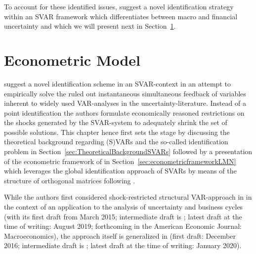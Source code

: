 \documentclass[a4paper,11pt,listof=nochaptergap,oneside,pointednumbers,bibtotoc,bigheadings,liststotoc,hidelinks]{scrbook}
\theoremstyle{mysatz}
\theoremstyle{mydefinition}
\theoremstyle{mytheorem}
\theoremstyle{mybemerkung}
\begin{document}
To account for these identified issues, \citet{ludvigsonetal:19} suggest a novel identification strategy within an SVAR framework which differentiates between macro and financial uncertainty and which we will present next in Section~\ref{EconometricModel}.




\chapter{Econometric Model}
\label{EconometricModel}
\citep{ludvigsonetal:18,ludvigsonetal:19} suggest a novel identification scheme in an SVAR-context in an attempt to empirically solve the ruled out instantaneous simultaneous feedback of variables inherent to widely used VAR-analyses in the uncertainty-literature. Instead of a point identification the authors formulate economically reasoned restrictions on the shocks generated by the SVAR-system to adequately shrink the set of possible solutions. This chapter hence first sets the stage by discussing the theoretical background regarding (S)VARs and the so-called identification problem in Section~\ref{sec:TheoreticalBackgroundSVARs} followed by a presentation of the econometric framework of \citet{ludvigsonetal:19} in Section~\ref{sec:econometricframeworkLMN} which leverages the global identification approach of SVARs by means of the structure of orthogonal matrices following \citet{rubioetal:10}.

While the authors first considered shock-restricted structural VAR-approach in \citet{ludvigsonetal:19} in the context of an application to the analysis of uncertainty and business cycles (with its first draft from March 2015; intermediate draft is \citet{ludvigsonetal:18}; latest draft at the time of writing: August 2019; forthcoming in the American Economic Journal: Macroeconomics), the approach itself is generalized in \citet{ludvigsonetal:20a} (first draft: December 2016; intermediate draft is \citet{ludvigsonetal:17}; latest draft at the time of writing: January 2020).
\end{document}
